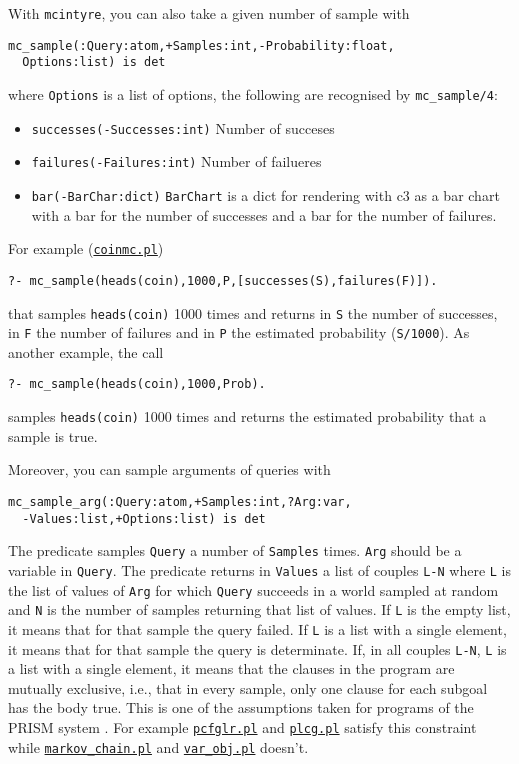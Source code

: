 With \verb|mcintyre|, you can also take a given number of sample with
\begin{verbatim}
mc_sample(:Query:atom,+Samples:int,-Probability:float,
  Options:list) is det
\end{verbatim}
where
\verb|Options| is a list of options, the following are recognised by \verb|mc_sample/4|:
\begin{itemize}
\item \verb|successes(-Successes:int)|
Number of succeses
\item \verb|failures(-Failures:int)|
Number of failueres
\item \verb|bar(-BarChar:dict)|
\verb|BarChart| is a dict for rendering with c3 as a bar chart with
a bar for the number of successes and a bar for the number
of failures.
\end{itemize}
For example (\href{http://cplint.eu/example/inference/coinmc.pl}{\texttt{coinmc.pl}})
\begin{verbatim}
?- mc_sample(heads(coin),1000,P,[successes(S),failures(F)]).
\end{verbatim}
that samples \verb|heads(coin)| 1000 times and returns in \verb|S| the number of successes, in \verb|F| the number of failures and in \verb|P| the
estimated probability (\verb|S/1000|).
As another example, the call
\begin{verbatim}
?- mc_sample(heads(coin),1000,Prob).
\end{verbatim}
samples \verb|heads(coin)| 1000 times and returns the
estimated probability that a sample is true.


Moreover, you can sample arguments of queries with
\begin{verbatim}
mc_sample_arg(:Query:atom,+Samples:int,?Arg:var,
  -Values:list,+Options:list) is det
\end{verbatim}
The predicate samples \verb|Query| a number of \verb|Samples| times.
\verb|Arg| should be a variable in \verb|Query|.
The predicate returns in \verb|Values| a list of couples \verb|L-N| where
\verb|L| is the list of values of \verb|Arg| for which \verb|Query|
succeeds in a world sampled at random and \verb|N|
is the number of samples returning that list of values.
If \verb|L| is the empty list, it means that for that
sample the query failed.
If \verb|L| is a list with a
single element, it means that for that sample the query is
determinate.
If, in all couples \verb|L-N|, \verb|L|
is a list with a
single element, it means that the clauses in the program
are mutually exclusive, i.e., that in every sample, only
one clause for each subgoal has the body true. This is one
of the assumptions taken for programs of the PRISM system \cite{DBLP:journals/jair/SatoK01}.
For example
\href{http://cplint.eu/example/inference/pcfglr.pl}{\texttt{pcfglr.pl}} and \href{http://cplint.eu/example/inference/plcg.pl}{\texttt{plcg.pl}} satisfy this constraint while
 \href{http://cplint.eu/example/inference/markov_chain.pl}{\texttt{markov\_chain.pl}} and \href{http://cplint.eu/example/inference/var_obj.pl}{\texttt{var\_obj.pl}} doesn't.


